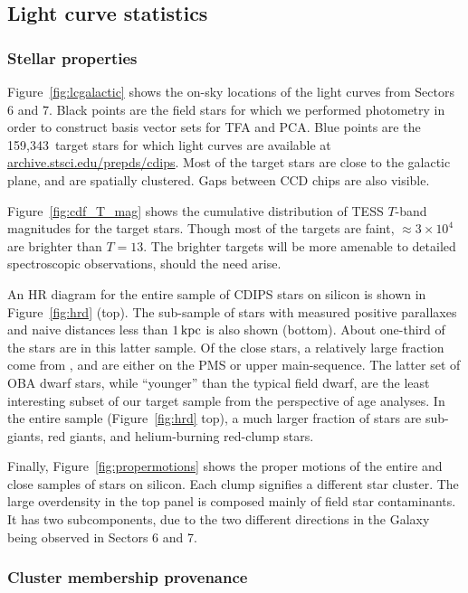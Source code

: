 \documentclass[12pt,twocolumn,tighten]{aastex62}
\newcommand{\numberlcs}{159{,}343\ } %
\newcommand{\stscilink}{\url{archive.stsci.edu/prepds/cdips}}
\begin{document}
\subsection{Light curve statistics}
\label{subsec:lcstatistics}

\subsubsection{Stellar properties}

Figure~\ref{fig:lcgalactic} shows the on-sky locations of the 
light curves from Sectors 6 and 7.  Black points are the field stars
for which we performed photometry in order to construct
basis vector sets for TFA and PCA.
Blue points are the \numberlcs target stars for which light curves are available at
\stscilink.  Most of the target stars are close to the galactic
plane, and are spatially clustered. 
Gaps between CCD chips are also visible.

Figure~\ref{fig:cdf_T_mag} shows the cumulative distribution of TESS
$T$-band magnitudes for the target stars.  Though most of the targets
are faint, $\approx3\times10^4$ are brighter than $T=13$. The brighter
targets will be more amenable to detailed spectroscopic observations,
should the need arise.

An HR diagram for the entire sample of CDIPS stars on silicon is shown
in Figure~\ref{fig:hrd} (top).  The sub-sample of stars with measured
positive parallaxes and naive distances less than $1\,{\rm kpc}$ is
also shown (bottom).  About one-third of the stars are in this latter
sample.  Of the close stars, a relatively large fraction come from
\citet{zari_3d_2018}, and are either on the PMS or upper
main-sequence.  The latter set of OBA dwarf stars, while ``younger''
than the typical field dwarf, are the least interesting subset
of our target sample from the perspective of age analyses.  In the
entire sample (Figure~\ref{fig:hrd} top), a much larger fraction of
stars are sub-giants, red giants, and helium-burning red-clump stars.

Finally, Figure~\ref{fig:propermotions} shows the proper motions of
the entire and close samples of stars on silicon.  Each clump
signifies a different star cluster. The large overdensity in the top
panel is composed mainly of field star contaminants. It has two
subcomponents, due to the two different directions in the Galaxy being
observed in Sectors 6 and 7.


\subsubsection{Cluster membership provenance}
\end{document}
